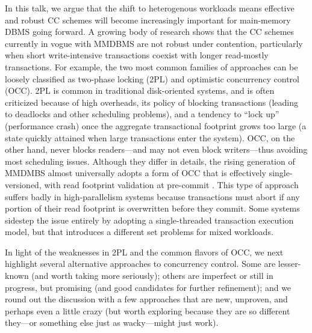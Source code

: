 In this talk, we argue that the shift to heterogenous workloads means effective and robust CC schemes will become increasingly important for main-memory DBMS going forward. A growing body of research shows that the CC schemes currently in vogue with MMDBMS are not robust under contention, particularly when short write-intensive transactions coexist with longer read-mostly transactions. For example, the two most common families of approaches can be loosely classified as two-phase locking (2PL) and optimistic concurrency control (OCC). 2PL is common in traditional disk-oriented systems, and is often criticized because of high overheads, its policy of blocking transactions (leading to deadlocks and other scheduling problems), and a tendency to ``lock up'' (performance crash) once the aggregate transactional footprint grows too large (a state quickly attained when large transactions enter the system). OCC, on the other hand, never blocks readers---and may not even block writers---thus avoiding most scheduling issues. Although they differ in details, the rising generation of MMDMBS almost universally adopts a form of OCC that is effectively single-versioned, with read footprint validation at pre-commit \cite{LarsonBDFPZ11,TuZKLM13}. This type of approach suffers badly in high-parallelism systems \cite{YuBPDS14} because transactions must abort if any portion of their read footprint is overwritten before they commit. Some systems \cite{Kallman+08,KemperN11} sidestep the issue entirely by adopting a single-threaded transaction execution model, but that introduces a different set problems for mixed workloads.

In light of the weaknesses in 2PL and the common flavors of OCC, we next highlight several alternative approaches to concurrency control. Some are lesser-known (and worth taking more seriously); others are imperfect or still in progress, but promising (and good candidates for further refinement); and we round out the discussion with a few approaches that are new, unproven, and perhaps even a little crazy (but worth exploring because they are so different they---or something else just as wacky---might just work).

